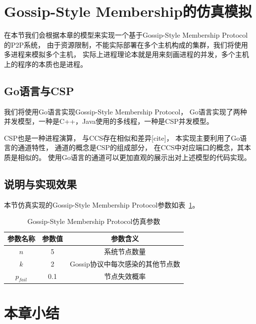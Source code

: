 \section{Gossip-Style Membership的仿真模拟}
在本节我们会根据本章的模型来实现一个基于Gossip-Style Membership Protocol的P2P系统，
由于资源限制，不能实际部署在多个主机构成的集群，我们将使用多进程来模拟多个主机，
实际上进程理论本就是用来刻画进程的并发，多个主机上的程序的本质也是进程。

\subsection{Go语言与CSP}
我们将使用Go语言实现Gossip-Style Membership Protocol，
Go语言实现了两种并发模型，一种是C++，Java使用的多线程，一种是CSP并发模型。

CSP也是一种进程演算，
与CCS存在相似和差异[cite]，
本实现主要利用了Go语言的通道特性，
通道的概念是CSP的组成部分，
在CCS中对应端口的概念，其本质是相似的。
使用Go语言的通道可以更加直观的展示出对上述模型的代码实现。

\subsection{说明与实现效果}
本节仿真实现的Gossip-Style Membership Protocol参数如表~\ref{tab:param}。
\begin{table}[!hpt]
   \caption[Gossip-Style Membership Protocol仿真参数]{Gossip-Style Membership Protocol仿真参数}
   \label{tab:param}
   \centering
   \begin{tabular}{@{}ccc@{}} \toprule
     参数名称 & 参数值 & 参数含义 \\ \midrule
     $n$ & 5 & 系统节点数量\\
     $k$ & 2 & Gossip协议中每次感染的其他节点数\\
     $p_{fail}$ & 0.1 & 节点失效概率\\ \bottomrule
   \end{tabular}
 \end{table}

 \section{本章小结}